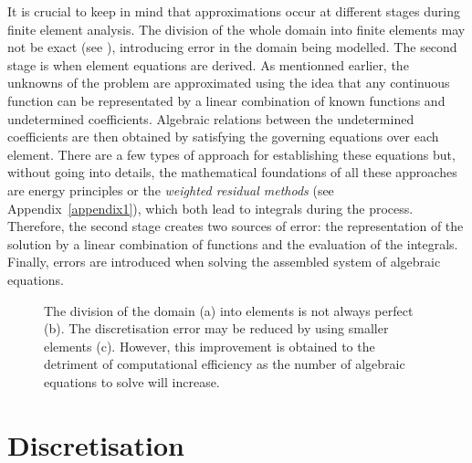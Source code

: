 It is crucial to keep in mind that approximations occur at different stages during finite element analysis. The division of the whole domain into finite elements may not be exact (see ), introducing error in the domain being modelled. The second stage is when element equations are derived. As mentionned earlier, the unknowns of the problem are approximated using the idea that any continuous function can be representated by a linear combination of known functions and undetermined coefficients. Algebraic relations between the undetermined coefficients are then obtained by satisfying the governing equations over each element. There are a few types of approach for establishing these equations but, without going into details, the mathematical foundations of all these approaches are energy principles or the \emph{weighted residual methods} (see Appendix~\ref{appendix1}), which both lead to integrals during the process. Therefore, the second stage creates two sources of error: the representation of the solution by a linear combination of functions and the evaluation of the integrals. Finally, errors are introduced when solving the assembled system of algebraic equations. 
%
\begin{figure}[ht]
\centering 
{}
\hfill 
{}
\hfill 
{}
\caption[Error introduced by the division into elements]{The division of the domain (a) into elements is not always perfect (b). The discretisation error may be reduced by using smaller elements (c). However, this improvement is obtained to the detriment of computational efficiency as the number of algebraic equations to solve will increase.}
\label{chap3:fig-errorWithSubdivision}
\end{figure}


\section{Discretisation}

